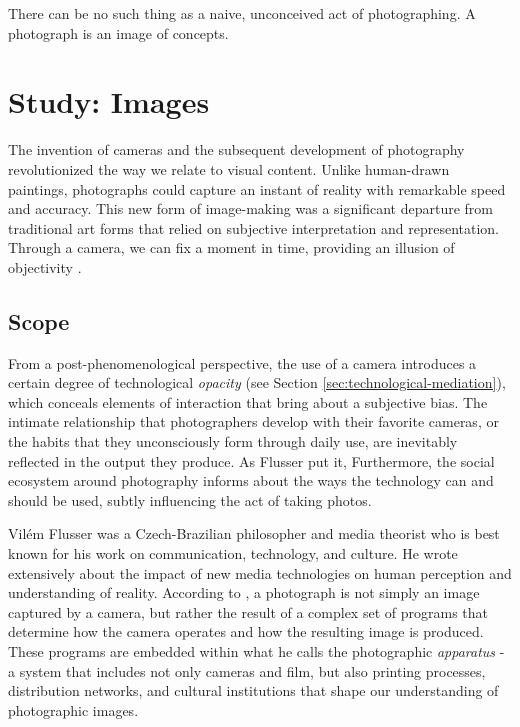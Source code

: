 \begin{savequote}[75mm]
	There can be no such thing as a naive, unconceived act of photographing. A photograph is an image of concepts.
\end{savequote}

\chapter{Study: Images}\label{study-images}


 The invention of cameras and the subsequent development of photography revolutionized the way we relate to visual content. Unlike human-drawn paintings, photographs could capture an instant of reality with remarkable speed and accuracy. This new form of image-making was a significant departure from traditional art forms that relied on subjective interpretation and representation. Through a camera, we can fix a moment in time, providing an illusion of objectivity \citep{Batchen1997}. 

\section{Scope}

From a post-phenomenological perspective, the use of a camera introduces a certain degree of technological \emph{opacity} \citep{Eede2010} (see Section \ref{sec:technological-mediation}), which conceals elements of interaction that bring about a subjective bias. The intimate relationship that photographers develop with their favorite cameras, or the habits that they unconsciously form through daily use, are inevitably reflected in the output they produce. As Flusser put it,  Furthermore, the social ecosystem around photography informs about the ways the technology can and should be used, subtly influencing the act of taking photos.

Vilém Flusser was a Czech-Brazilian philosopher and media theorist who is best known for his work on communication, technology, and culture. He wrote extensively about the impact of new media technologies on human perception and understanding of reality. According to \cite{Flusser2000}, a photograph is not simply an image captured by a camera, but rather the result of a complex set of programs that determine how the camera operates and how the resulting image is produced. These programs are embedded within what he calls the photographic \textit{apparatus} - a system that includes not only cameras and film, but also printing processes, distribution networks, and cultural institutions that shape our understanding of photographic images.

